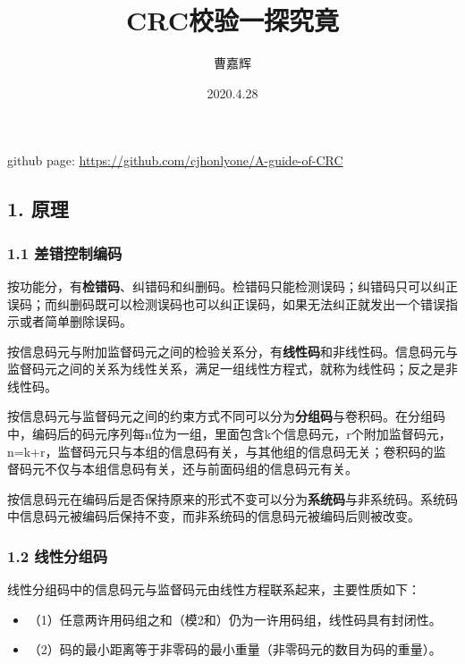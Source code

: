 \documentclass[
]{article}
\title{\huge \textbf{CRC校验一探究竟}}
\author{曹嘉辉}
\date{2020.4.28}
\begin{document}
\maketitle
github page: \url{https://github.com/cjhonlyone/A-guide-of-CRC}

\tableofcontents

\newpage
\hypertarget{header-n3}{%
\subsection{1. 原理}\label{header-n3}}

\hypertarget{header-n4}{%
\subsubsection{1.1 差错控制编码}\label{header-n4}}

按功能分，有\textbf{检错码}、纠错码和纠删码。检错码只能检测误码；纠错码只可以纠正误码；而纠删码既可以检测误码也可以纠正误码，如果无法纠正就发出一个错误指示或者简单删除误码。

按信息码元与附加监督码元之间的检验关系分，有\textbf{线性码}和非线性码。信息码元与监督码元之间的关系为线性关系，满足一组线性方程式，就称为线性码；反之是非线性码。

按信息码元与监督码元之间的约束方式不同可以分为\textbf{分组码}与卷积码。在分组码中，编码后的码元序列每n位为一组，里面包含k个信息码元，r个附加监督码元，n=k+r，监督码元只与本组的信息码有关，与其他组的信息码无关；卷积码的监督码元不仅与本组信息码有关，还与前面码组的信息码元有关。

按信息码元在编码后是否保持原来的形式不变可以分为\textbf{系统码}与非系统码。系统码中信息码元被编码后保持不变，而非系统码的信息码元被编码后则被改变。

\hypertarget{header-n9}{%
\subsubsection{1.2 线性分组码}\label{header-n9}}

线性分组码中的信息码元与监督码元由线性方程联系起来，主要性质如下：

\begin{itemize}
\item
  （1）任意两许用码组之和（模2和）仍为一许用码组，线性码具有封闭性。
\item
  （2）码的最小距离等于非零码的最小重量（非零码元的数目为码的重量）。
\end{itemize}
\end{document}
